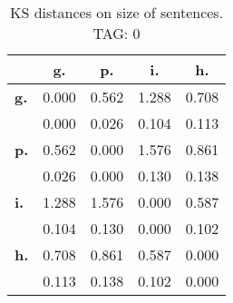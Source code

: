 \begin{table}[h!]
\begin{center}
\begin{tabular}{| l || c | c | c | c |}\hline
 & {\bf g.} & {\bf p.} & {\bf i.} & {\bf h.} \\\hline\hline
{\bf g.} & 0.000 & 0.562 & 1.288 & 0.708 \\
{\bf } & 0.000 & 0.026 & 0.104 & 0.113 \\\hline
{\bf p.} & 0.562 & 0.000 & 1.576 & 0.861 \\
{\bf } & 0.026 & 0.000 & 0.130 & 0.138 \\\hline
{\bf i.} & 1.288 & 1.576 & 0.000 & 0.587 \\
{\bf } & 0.104 & 0.130 & 0.000 & 0.102 \\\hline
{\bf h.} & 0.708 & 0.861 & 0.587 & 0.000 \\
{\bf } & 0.113 & 0.138 & 0.102 & 0.000 \\\hline
\end{tabular}
\caption{KS distances on size of sentences. TAG: 0}
\end{center}
\end{table}